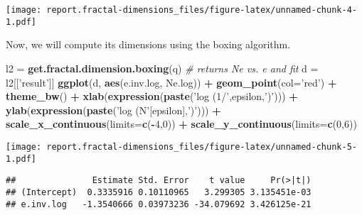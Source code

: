 \documentclass[]{article}
\newenvironment{Shaded}{\begin{snugshade}}{\end{snugshade}}
\newcommand{\CommentTok}[1]{\textcolor[rgb]{0.56,0.35,0.01}{\textit{#1}}}
\newcommand{\DataTypeTok}[1]{\textcolor[rgb]{0.13,0.29,0.53}{#1}}
\newcommand{\DecValTok}[1]{\textcolor[rgb]{0.00,0.00,0.81}{#1}}
\newcommand{\KeywordTok}[1]{\textcolor[rgb]{0.13,0.29,0.53}{\textbf{#1}}}
\newcommand{\NormalTok}[1]{#1}
\newcommand{\OperatorTok}[1]{\textcolor[rgb]{0.81,0.36,0.00}{\textbf{#1}}}
\newcommand{\StringTok}[1]{\textcolor[rgb]{0.31,0.60,0.02}{#1}}
\begin{document}
\texttt{[image: report.fractal-dimensions\_files/figure-latex/unnamed-chunk-4-1.pdf]}

Now, we will compute its dimensions using the boxing algorithm.

\begin{Shaded}
\begin{Highlighting}[]
\NormalTok{l2 =}\StringTok{ }\KeywordTok{get.fractal.dimension.boxing}\NormalTok{(q)}
\CommentTok{# returns Ne vs. e and fit}
\NormalTok{d =}\StringTok{ }\NormalTok{l2[[}\StringTok{'result'}\NormalTok{]]}
\KeywordTok{ggplot}\NormalTok{(d, }\KeywordTok{aes}\NormalTok{(e.inv.log, Ne.log)) }\OperatorTok{+}\StringTok{ }\KeywordTok{geom_point}\NormalTok{(}\DataTypeTok{col=}\StringTok{'red'}\NormalTok{) }\OperatorTok{+}
\StringTok{  }\KeywordTok{theme_bw}\NormalTok{() }\OperatorTok{+}\StringTok{ }
\StringTok{  }\KeywordTok{xlab}\NormalTok{(}\KeywordTok{expression}\NormalTok{(}\KeywordTok{paste}\NormalTok{(}\StringTok{'log (1/'}\NormalTok{,epsilon,}\StringTok{')'}\NormalTok{))) }\OperatorTok{+}
\StringTok{  }\KeywordTok{ylab}\NormalTok{(}\KeywordTok{expression}\NormalTok{(}\KeywordTok{paste}\NormalTok{(}\StringTok{'log (N'}\NormalTok{[epsilon],}\StringTok{')'}\NormalTok{))) }\OperatorTok{+}\StringTok{ }
\StringTok{  }\KeywordTok{scale_x_continuous}\NormalTok{(}\DataTypeTok{limits=}\KeywordTok{c}\NormalTok{(}\OperatorTok{-}\DecValTok{4}\NormalTok{,}\DecValTok{0}\NormalTok{)) }\OperatorTok{+}\StringTok{ }
\StringTok{  }\KeywordTok{scale_y_continuous}\NormalTok{(}\DataTypeTok{limits=}\KeywordTok{c}\NormalTok{(}\DecValTok{0}\NormalTok{,}\DecValTok{6}\NormalTok{))}
\end{Highlighting}
\end{Shaded}

\texttt{[image: report.fractal-dimensions\_files/figure-latex/unnamed-chunk-5-1.pdf]}

\begin{Shaded}
\end{Shaded}

\begin{verbatim}
##               Estimate Std. Error    t value     Pr(>|t|)
## (Intercept)  0.3335916 0.10110965   3.299305 3.135451e-03
## e.inv.log   -1.3540666 0.03973236 -34.079692 3.426125e-21
\end{verbatim}
\end{document}
